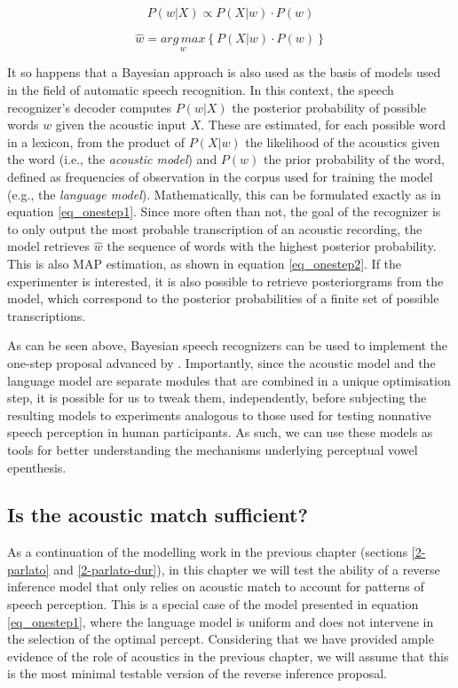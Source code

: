 \begin{equation}
  P(w | X) \propto P(X | w) \cdot P(w)
  \label{eq_onestep1}
\end{equation}

\begin{equation}
  \widehat{w} = \underset{w}{arg\,max} \left \{ P(X|w) \cdot P(w) \right \}
  \label{eq_onestep2}
\end{equation}


It so happens that a Bayesian approach is also used as the basis of models used in the field of automatic speech recognition. In this context, the speech recognizer's decoder computes $P(w | X)$ the posterior probability of possible words $w$ given the acoustic input $X$. These are estimated, for each possible word in a lexicon, from the product of $P(X|w)$ the likelihood of the acoustics given the word (i.e., the \textit{acoustic model}) and $P(w)$ the prior probability of the word, defined as frequencies of observation in the corpus used for training the model (e.g., the \textit{language model}). Mathematically, this can be formulated exactly as in equation \ref{eq_onestep1}. Since more often than not, the goal of the recognizer is to only output the most probable transcription of an acoustic recording, the model retrieves  $\widehat{w}$ the sequence of words with the highest posterior probability. This is also MAP estimation, as shown in equation \ref{eq_onestep2}. If the experimenter is interested, it is also possible to retrieve posteriorgrams from the model, which correspond to the posterior probabilities of a finite set of possible transcriptions.

As can be seen above, Bayesian speech recognizers can be used to implement the one-step proposal advanced by \cite{wilson2013}. Importantly, since the acoustic model and the language model are separate modules that are combined in a unique optimisation step, it is possible for us to tweak them, independently, before subjecting the resulting models to experiments analogous to those used for testing nonnative speech perception in human participants. As such, we can use these models as tools for better understanding the mechanisms underlying perceptual vowel epenthesis. 

\subsection{Is the acoustic match sufficient?}
As a continuation of the modelling work in the previous chapter (sections \ref{2-parlato} and \ref{2-parlato-dur}), in this chapter we will test the ability of a reverse inference model that only relies on acoustic match to account for patterns of speech perception. This is a special case of the model presented in equation \ref{eq_onestep1}, where the language model is uniform and does not intervene in the selection of the optimal percept. Considering that we have provided ample evidence of the role of acoustics in the previous chapter, we will assume that this is the most minimal testable version of the reverse inference proposal.

